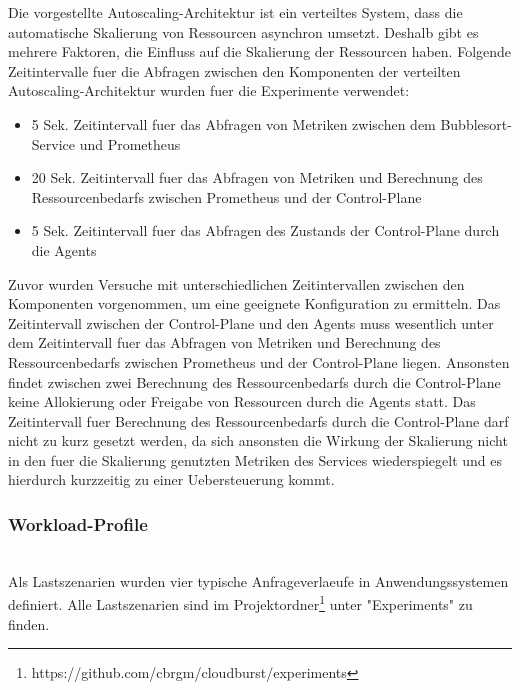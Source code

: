 \documentclass[runningheads]{llncs}
\begin{document}
Die vorgestellte Autoscaling-Architektur ist ein verteiltes System, dass die automatische Skalierung von Ressourcen asynchron umsetzt. Deshalb gibt es mehrere Faktoren, die Einfluss auf die Skalierung der Ressourcen haben. Folgende Zeitintervalle fuer die Abfragen zwischen den Komponenten der verteilten Autoscaling-Architektur wurden fuer die Experimente verwendet: 

 \begin{itemize}
	\item  5 Sek. Zeitintervall fuer das Abfragen von Metriken zwischen dem Bubblesort-Service und Prometheus
	\item  20 Sek. Zeitintervall fuer das Abfragen von Metriken und Berechnung des Ressourcenbedarfs zwischen Prometheus und der Control-Plane
	\item  5 Sek. Zeitintervall fuer das Abfragen des Zustands der Control-Plane durch die Agents
\end{itemize}

Zuvor wurden Versuche mit unterschiedlichen Zeitintervallen zwischen den Komponenten vorgenommen, um eine geeignete Konfiguration zu ermitteln.
Das Zeitintervall zwischen der Control-Plane und den Agents muss wesentlich unter dem Zeitintervall fuer das Abfragen von Metriken und Berechnung des Ressourcenbedarfs zwischen Prometheus und der Control-Plane liegen. Ansonsten findet zwischen zwei Berechnung des Ressourcenbedarfs durch die Control-Plane keine Allokierung oder Freigabe von Ressourcen durch die Agents statt. Das Zeitintervall fuer Berechnung des Ressourcenbedarfs durch die Control-Plane darf nicht zu kurz gesetzt werden, da sich ansonsten die Wirkung der Skalierung nicht in den fuer die Skalierung genutzten Metriken des Services wiederspiegelt und es hierdurch kurzzeitig zu einer Uebersteuerung kommt. \\

\subsubsection{Workload-Profile} \hfill\\

Als Lastszenarien wurden vier typische Anfrageverlaeufe in Anwendungssystemen definiert. Alle Lastszenarien sind im Projektordner\footnote{https://github.com/cbrgm/cloudburst/experiments} unter "Experiments" zu finden.
\end{document}
